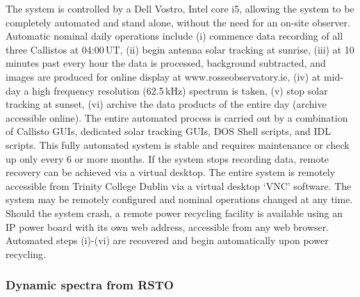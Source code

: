 The system is controlled by a Dell Vostro, Intel core i5, allowing the system to be completely automated and stand alone, without the need for an on-site observer. Automatic nominal daily operations include (i) commence data recording of all three Callistos at 04:00\,UT, (ii) begin antenna solar tracking at sunrise, (iii) at 10 minutes past every hour the data is processed, background subtracted, and images are produced for online display at www.rosseobservatory.ie, (iv) at mid-day a high frequency resolution (62.5\,kHz) spectrum is taken, (v) stop solar tracking at sunset, (vi) archive the data products of the entire day (archive accessible online). The entire automated process is carried out by a combination of Callisto GUIs, dedicated solar tracking GUIs, DOS Shell scripts, and IDL scripts. This fully automated system is stable and requires maintenance or check up only every 6 or more months. If the system stops recording data, remote recovery can be achieved via a virtual desktop. The entire system is remotely accessible from Trinity College Dublin via a virtual desktop `VNC' software. The system may be remotely configured and nominal operations changed at any time. Should the system crash, a remote power recycling facility is available using an IP power board with its own web address, accessible from any web browser. Automated steps (i)-(vi) are recovered and begin automatically upon power recycling.

\subsubsection{Dynamic spectra from RSTO}

